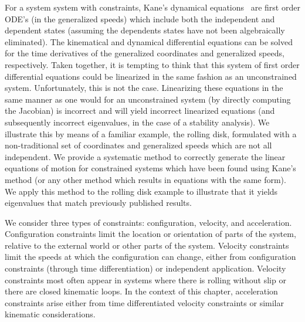 For a system system with constraints, Kane's dynamical
equations~\cite{Kane1985} are first order ODE's (in the generalized speeds)
which include both the independent and dependent states (assuming the
dependents states have not been algebraically eliminated). The kinematical and
dynamical differential equations can be solved for the time derivatives of the
generalized coordinates and generalized speeds, respectively. Taken together,
it is tempting to think that this system of first order differential equations
could be linearized in the same fashion as an unconstrained system.
Unfortunately, this is not the case.  Linearizing these equations in the same
manner as one would for an unconstrained system (by directly computing the
Jacobian) is incorrect and will yield incorrect linearized equations (and
subsequently incorrect eigenvalues, in the case of a stability analysis). We
illustrate this by means of a familiar example, the rolling disk, formulated
with a non-traditional set of coordinates and generalized speeds which are not
all independent. We provide a systematic method to correctly generate the
linear equations of motion for constrained systems which have been found using
Kane's method (or any other method which results in equations with the same
form). We apply this method to the rolling disk example to illustrate that it
yields eigenvalues that match previously published results.

We consider three types of constraints: configuration, velocity, and
acceleration. Configuration constraints limit the location or orientation of
parts of the system, relative to the external world or other parts of the
system. Velocity constraints limit the speeds at which the configuration can
change, either from configuration constraints (through time differentiation) or
independent application. Velocity constraints most often appear in systems
where there is rolling without slip or there are closed kinematic loops. In the
context of this chapter, acceleration constraints arise either from time
differentiated velocity constraints or similar kinematic considerations.

